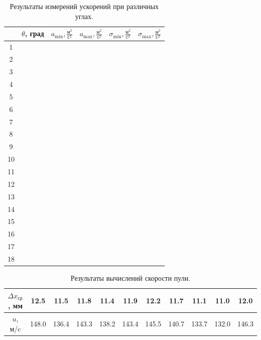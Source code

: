 \documentclass[
	a4paper, %
	12pt, %
]{article}
\begin{document}
	\begin{table}[h]
		\centering
		\begin{tabular}[H]{|c|c|c|c|c|c|}
			\hline
			\textnumero & $\theta$, град & $a_{\min},\frac{\text{м}^2}{\text{с}^2}$ & $a_{\max},\frac{\text{м}^2}{\text{с}^2}$ & $\sigma_{\min},\frac{\text{м}^2}{\text{с}^2}$ & $\sigma_{\max},\frac{\text{м}^2}{\text{с}^2}$  \\
			\hline
			1 &  &  &  &  &   \\
			\hline
			2 &  &  &  &  &    \\
			\hline
			3 &  &  &  &  &    \\
			\hline
			4 &  &  &  &  &   \\
			\hline
			5 &  &  &  &  &   \\
			\hline
			6 &  &  &  &  &    \\
			\hline
			7 &  &  &  &  &    \\
			\hline
			8 &  &  &  &  &   \\
			\hline
			9 &  &  &  &  &   \\
			\hline
			10 &  &  &  &  &    \\
			\hline
			11 &  &  &  &  &    \\
			\hline
			12 &  &  &  &  &   \\
			\hline
			13 &  &  &  &  &   \\
			\hline
			14 &  &  &  &  &    \\
			\hline
			15 &  &  &  &  &    \\
			\hline
			16 &  &  &  &  &   \\
			\hline
			17 &  &  &  &  &    \\
			\hline
			18 &  &  &  &  &   \\
			\hline
		\end{tabular}
		\caption{Результаты измерений ускорений при различных углах.}
		\label{table:2}
	\end{table}
	\begin{table}[h]
		\centering
		\begin{tabular}[H]{|c|c|c|c|c|c|c|c|c|c|c|}
			\hline
			$\Delta x_{\text{ср}}$, мм & 12.5 & 11.5 & 11.8 & 11.4 & 11.9 & 12.2 & 11.7 & 11.1 & 11.0 & 12.0  \\
			\hline
			$u$, м/c & 148.0 & 136.4 & 143.3 & 138.2 & 143.4  & 145.5 & 140.7 & 133.7 & 132.0 & 146.3  \\
			\hline
		\end{tabular}
		\caption{Результаты вычислений скорости пули.}
		\label{table:3}
	\end{table}
	
\end{document}
